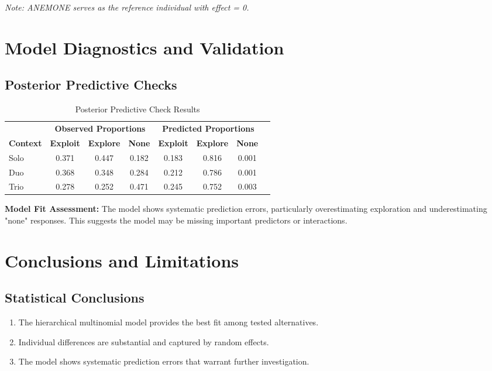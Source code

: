 \documentclass[11pt,a4paper]{article}
\begin{document}
\textit{Note: ANEMONE serves as the reference individual with effect = 0.}

\section{Model Diagnostics and Validation}

\subsection{Posterior Predictive Checks}

\begin{table}[H]
\centering
\caption{Posterior Predictive Check Results}
\begin{tabular}{lccccccc}
\toprule
& \multicolumn{3}{c}{\textbf{Observed Proportions}} & \multicolumn{3}{c}{\textbf{Predicted Proportions}} \\
\cmidrule(lr){2-4} \cmidrule(lr){5-7}
\textbf{Context} & \textbf{Exploit} & \textbf{Explore} & \textbf{None} & \textbf{Exploit} & \textbf{Explore} & \textbf{None} \\
\midrule
Solo & 0.371 & 0.447 & 0.182 & 0.183 & 0.816 & 0.001 \\
Duo & 0.368 & 0.348 & 0.284 & 0.212 & 0.786 & 0.001 \\
Trio & 0.278 & 0.252 & 0.471 & 0.245 & 0.752 & 0.003 \\
\bottomrule
\end{tabular}
\end{table}

\textbf{Model Fit Assessment:} The model shows systematic prediction errors, particularly overestimating exploration and underestimating "none" responses. This suggests the model may be missing important predictors or interactions.

\section{Conclusions and Limitations}

\subsection{Statistical Conclusions}

\begin{enumerate}
\item The hierarchical multinomial model provides the best fit among tested alternatives.
\item Individual differences are substantial and captured by random effects.
\item The model shows systematic prediction errors that warrant further investigation.
\end{enumerate}
\end{document}
